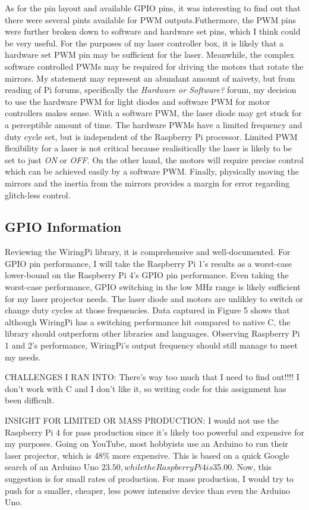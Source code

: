 \documentclass[journal]{IEEEtran}
\begin{document}
    As for the pin layout and available GPIO pins, it was interesting to find out that there were several pints available for PWM outputs.Futhermore, the PWM pins were further broken down to software and hardware set pins, which I think could be very useful.
    For the purposes of my laser controller box, it is likely that a hardware set PWM pin may be sufficient for the laser.
    Meanwhile, the complex software controlled PWMs may be required for driving the motors that rotate the mirrors.
    My statement may represent an abundant amount of naivety, but from reading of Pi forums, specifically the \emph{Hardware or Software?} forum, my decision to use the hardware PWM for light diodes and software PWM for motor controllers makes sense.
    With a software PWM, the laser diode may get stuck for a perceptible amount of time.
    The hardware PWMs have a limited frequency and duty cycle set, but is independent of the Raspberry Pi processor.
    Limited PWM flexibility for a laser is not critical because realisitically the laser is likely to be set to just \emph{ON} or \emph{OFF}.
    On the other hand, the motors will require precise control which can be achieved easily by a software PWM.
    Finally, physically moving the mirrors and the inertia from the mirrors provides a margin for error regarding glitch-less control.
    
    \subsection{GPIO Information}
    Reviewing the WiringPi library, it is comprehensive and well-documented. 
    For GPIO pin performance, I will take the Raspberry Pi 1's results as a worst-case lower-bound on the Raspberry Pi 4's GPIO pin performance.
    Even taking the worst-case performance, GPIO switching in the low MHz range is likely sufficient for my laser projector needs.
    The laser diode and motors are unlikley to switch or change duty cycles at those frequencies.
    Data captured in Figure 5 shows that although WiringPi has a switching performance hit compared to native C, the library should outperform other libraries and languages.
    Observing Raspberry Pi 1 and 2's performance, WiringPi's output frequency should still manage to meet my needs.

    CHALLENGES I RAN INTO: There's way too much that I need to find out!!!! I don't work with C and I don't like it, so writing code for this assignment has been difficult.

    INSIGHT FOR LIMITED OR MASS PRODUCTION: \newline
    I would not use the Raspberry Pi 4 for pass production since it's likely too powerful and expensive for my purposes. 
    Going on YouTube, most hobbyists use an Arduino to run their laser projector, which is 48\% more expensive. 
    This is based on a quick Google search of an Arduino Uno $23.50, while the Raspberry Pi 4 is $35.00. 
    Now, this suggestion is for small rates of production. For mass production, I would try to push for a smaller, cheaper, less power intensive device than even the Arduino Uno.
\end{document}
